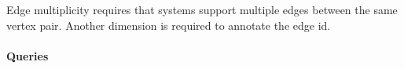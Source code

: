 
Edge multiplicity requires that systems support multiple edges between the same vertex pair. Another dimension is required to annotate the edge id.


\paragraph{Queries}
{\raggedright

}